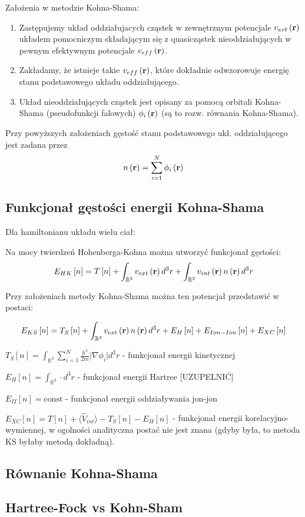 Założenia w metodzie Kohna-Shama:
\begin{enumerate}
\item Zastępujemy układ oddziałujacych cząstek w zewnętrznym potencjale
$v_{ext}\left({\bf r}\right)$ układem pomocniczym składającym się
z quasicząstek nieoddziałujących w pewnym efektywnym potencjale $v_{eff}\left({\bf r}\right)$.
\item Zakładamy, że istnieje takie $v_{eff}\left({\bf r}\right)$, które
dokładnie odwzorowuje energię stanu podstawowego układu oddziałującego.
\item Układ nieoddziałujących cząstek jest opisany za pomocą orbitali Kohna-Shama
(pseudofunkcji falowych) $\phi_{i}\left({\bf r}\right)$ (są to rozw.
równania Kohna-Shama).
\end{enumerate}
Przy powyższych założeniach gęstość stanu podstawowego ukł. oddziałującego
jest zadana przez
\[
n\left({\bf r}\right)=\sum_{i=1}^{N}\phi_{i}\left({\bf r}\right)
\]



\subsection{Funkcjonał gęstości energii Kohna-Shama}

Dla hamiltonianu układu wielu ciał:

Na mocy twierdzeń Hohenberga-Kohna można utworzyć funkcjonał gęstości:
\[
E_{HK}\left[n\right]=T\left[n\right]+\int_{\mathbb{R}^{3}}v_{ext}\left({\bf r}\right)d^{3}r+\int_{\mathbb{R}^{3}}v_{int}\left({\bf r}\right)n\left({\bf r}\right)d^{3}r
\]


Przy założeniach metody Kohna-Shama można ten potencjał przedstawić
w postaci:

\[
E_{KS}\left[n\right]=T_{S}\left[n\right]+\int_{\mathbb{R}^{3}}v_{ext}\left({\bf r}\right)n\left({\bf r}\right)d^{3}r+E_{H}\left[n\right]+E_{Ion-Ion}\left[n\right]+E_{XC}\left[n\right]
\]


$T_{S}\left[n\right]=\int_{\mathbb{R}^{3}}\sum_{i=1}^{N}\frac{\hbar^{2}}{2m}\vert\nabla\phi_{i}\vert d^{3}r$
- funkcjonał energii kinetycznej

$E_{H}\left[n\right]=\int_{\mathbb{R}^{3}}\cdot d^{3}r$ - funkcjonał
energii Hartree {[}UZUPELNIĆ{]}

$E_{II}\left[n\right]=\text{const}$ - funkcjonał energii oddziaływania
jon-jon

$E_{XC}\left[n\right]=T\left[n\right]+\langle\hat{V}_{int}\rangle-T_{S}\left[n\right]-E_{H}\left[n\right]$
- funkcjonał energii korelacyjno-wymiennej, w ogolności analityczna
postać nie jest znana (gdyby była, to metoda KS byłaby metodą dokładną).


\subsection{Równanie Kohna-Shama}


\subsection{Hartree-Fock vs Kohn-Sham}


